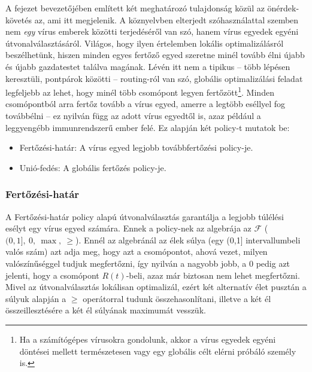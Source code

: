     A fejezet bevezetőjében említett két meghatározó tulajdonság közül az önérdek-követés az, ami itt megjelenik. A köznyelvben elterjedt szóhasználattal szemben nem \textit{egy} vírus emberek közötti terjedéséről van szó, hanem vírus egyedek egyéni útvonalválasztásáról. Világos, hogy ilyen értelemben lokális optimalizálásról beszélhetünk, hiszen minden egyes fertőző egyed szeretne minél tovább élni újabb és újabb gazdatestet találva magának. Lévén itt nem a tipikus -- több lépésen keresztüli, pontpárok közötti -- routing-ról van szó, globális optimalizálási feladat legfeljebb az lehet, hogy minél több csomópont legyen fertőzött\footnote{Ha a számítógépes vírusokra gondolunk, akkor a vírus egyedek egyéni döntései mellett természetesen vagy egy globális célt elérni próbáló személy is.}. Minden csomópontból arra fertőz tovább a vírus egyed, amerre a legtöbb eséllyel fog továbbélni -- ez nyilván függ az adott vírus egyedtől is, azaz például a leggyengébb immunrendszerű ember felé. Ez alapján két policy-t mutatok be:

    \begin{itemize}
      \item Fertőzési-határ: A vírus egyed legjobb továbbfertőzési policy-je.
      \item Unió-fedés: A globális fertőzés policy-je.
    \end{itemize}

      \subsubsection{Fertőzési-határ}
      A Fertőzési-határ policy alapú útvonalválasztás garantálja a legjobb túlélési esélyt egy vírus egyed számára. Ennek a policy-nek az algebrája az $\mathcal{F}$ ($(0,1],~0,~\max,~\geq$). Ennél az algebránál az élek súlya (egy (0,1] intervallumbeli valós szám) azt adja meg, hogy azt a csomópontot, ahová vezet, milyen valószínűséggel tudjuk megfertőzni, így nyilván a nagyobb jobb, a 0 pedig azt jelenti, hogy a csomópont $R(t)$-beli, azaz már biztosan nem lehet megfertőzni. Mivel az útvonalválasztás lokálisan optimalizál, ezért két alternatív élet pusztán a súlyuk alapján a $\geq$ operátorral tudunk összehasonlítani, illetve a két él összeillesztésére a két él súlyának maximumát vesszük.

